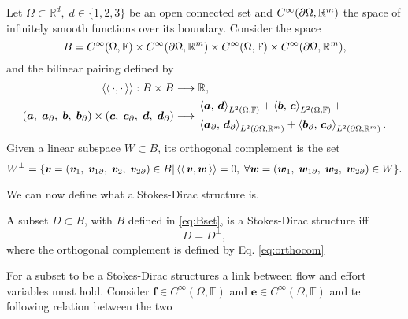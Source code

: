 \begin{definition}
Let $\Omega \subset \mathbb{R}^d, \; d \in \{1,2,3\}$ be an open connected set and $C^\infty(\partial\Omega, \bbR^m)$ the space of infinitely smooth functions over its boundary. Consider the space 
\begin{equation}\label{eq:Bset}
B = C^\infty(\Omega, \bbF) \times C^\infty(\partial\Omega, \bbR^m) \times C^\infty(\Omega, \bbF) \times C^\infty(\partial\Omega, \bbR^m),
\end{equation} 
and the bilinear pairing defined by
\begin{equation}\label{eq:bilprod}
\begin{aligned}
\bilprod{\cdot}{\cdot}: B \times B &\longrightarrow \bbR, \\
(\bm{a}, \; \bm{a}_\partial, \; \bm{b}, \; \bm{b}_\partial) \times (\bm{c}, \; \bm{c}_\partial, \; \bm{d}, \; \bm{d}_\partial) &\longrightarrow 
\begin{aligned}
&\inner[L^2(\Omega, \mathbb{F})]{\bm{a}}{\bm{d}} + \inner[L^2(\Omega, \mathbb{F})]{\bm{b}}{\bm{c}} + \\
&\inner[L^2(\partial\Omega, \bbR^m)]{\bm{a}_\partial}{\bm{d}_\partial} +\inner[L^2(\partial\Omega, \bbR^m)]{\bm{b}_\partial}{\bm{c}_\partial}.
\end{aligned}
\end{aligned}
\end{equation}
Given a linear subspace $W \subset B$, its orthogonal complement is the set
\begin{equation}\label{eq:orthocom}
W^\perp = \{\bm{v} = (\bm{v}_1, \; \bm{v}_{1 \partial}, \; \bm{v}_2, \; \bm{v}_{2 \partial})  \in B \vert \bilprod{\bm{v}}{\bm{w}} = 0, \;  \forall \bm{w} = (\bm{w}_1, \; \bm{w}_{1 \partial}, \; \bm{w}_2, \; \bm{w}_{2 \partial}) \in W\}.
\end{equation}
\end{definition} 
We can now define what a Stokes-Dirac structure is.

\begin{definition}
	A subset $D \subset B$, with $B$ defined in \eqref{eq:Bset}, is a Stokes-Dirac structure iff 
	\begin{equation}
	D = D^\perp,
	\end{equation}
	where the orthogonal complement is defined by Eq. \eqref{eq:orthocom}
\end{definition} 

For a subset to be a Stokes-Dirac structures a link between flow and effort variables must hold.  Consider $\bm{f} \in C^\infty(\Omega, \mathbb{F})$ and $\bm{e} \in C^\infty(\Omega, \mathbb{F})$ and te following relation between the two


